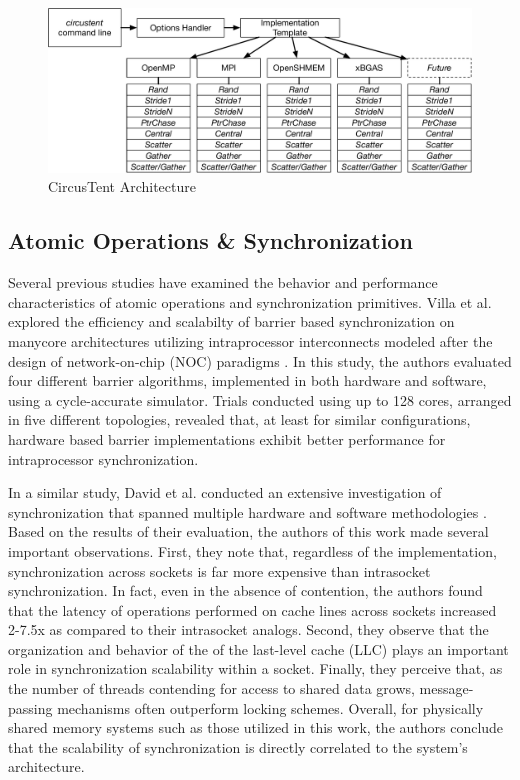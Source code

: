 
\begin{figure}[!t]
\centering
\includegraphics[width=5in]{figures/arch.pdf}
\caption{CircusTent Architecture}
\label{fig:ct_arch}
\end{figure}


\subsection{Atomic Operations \& Synchronization}
\label{subsec:amos_sync}

Several previous studies have examined the behavior and performance characteristics of atomic operations and synchronization primitives.
Villa et al. explored the efficiency and scalabilty of barrier based synchronization on manycore architectures utilizing intraprocessor interconnects modeled after the design of network-on-chip (NOC) paradigms \cite{villa2008barriers}.
In this study, the authors evaluated four different barrier algorithms, implemented in both hardware and software, using a cycle-accurate simulator.
Trials conducted using up to 128 cores, arranged in five different topologies, revealed that, at least for similar configurations, hardware based barrier implementations exhibit better performance for intraprocessor synchronization.

In a similar study, David et al. conducted an extensive investigation of synchronization that spanned multiple hardware and software methodologies \cite{david2013sync}.
Based on the results of their evaluation, the authors of this work made several important observations.
First, they note that, regardless of the implementation, synchronization across sockets is far more expensive than intrasocket synchronization.
In fact, even in the absence of contention, the authors found that the latency of operations performed on cache lines across sockets increased 2-7.5x as compared to their intrasocket analogs.
Second, they observe that the organization and behavior of the of the last-level cache (LLC) plays an important role in synchronization scalability within a socket.
Finally, they perceive that, as the number of threads contending for access to shared data grows, message-passing mechanisms often outperform locking schemes.
Overall, for physically shared memory systems such as those utilized in this work, the authors conclude that the scalability of synchronization is directly correlated to the system's architecture.

